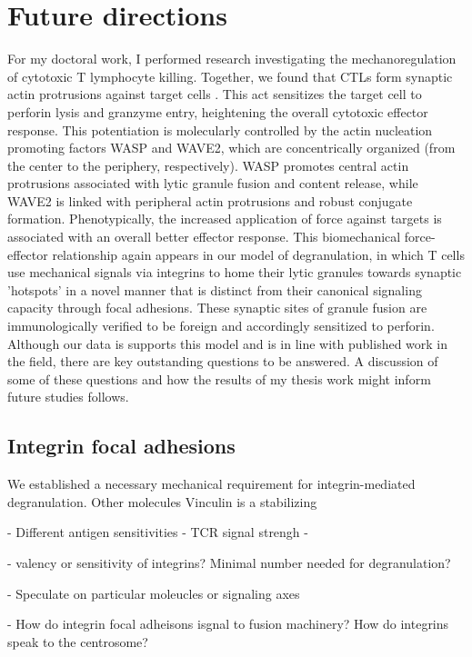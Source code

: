\section{Future directions} 

For my doctoral work, I performed research investigating the mechanoregulation of cytotoxic T lymphocyte killing. Together, we found that CTLs form synaptic actin protrusions against target cells \cite{Tamzalit2018}. This act sensitizes the target cell to perforin lysis and granzyme entry, heightening the overall cytotoxic effector response. This potentiation is molecularly controlled by the actin nucleation promoting factors WASP and WAVE2, which are concentrically organized (from the center to the periphery, respectively). WASP promotes central actin protrusions associated with lytic granule fusion and content release, while WAVE2 is linked with peripheral actin protrusions and robust conjugate formation. Phenotypically, the increased application of force against targets is associated with an overall better effector response. This biomechanical force-effector relationship again appears in our model of degranulation, in which T cells use mechanical signals via integrins to home their lytic granules towards synaptic 'hotspots' in a novel manner that is distinct from their canonical signaling capacity through focal adhesions. These synaptic sites of granule fusion are immunologically verified to be foreign and accordingly sensitized to perforin. Although our data is supports this model and is in line with published work in the field, there are key outstanding questions to be answered. A discussion of some of these questions and how the results of my thesis work might inform future studies follows.

\subsection{Integrin focal adhesions}
We established a necessary mechanical requirement for integrin-mediated degranulation. Other molecules Vinculin is a stabilizing 

- Different antigen sensitivities - TCR signal strengh - \cite{Shakiba2021}

- valency or sensitivity of integrins? Minimal number needed for degranulation?

- Speculate on particular moleucles or signaling axes

- How do integrin focal adheisons isgnal to fusion machinery? How do integrins speak to the centrosome?

